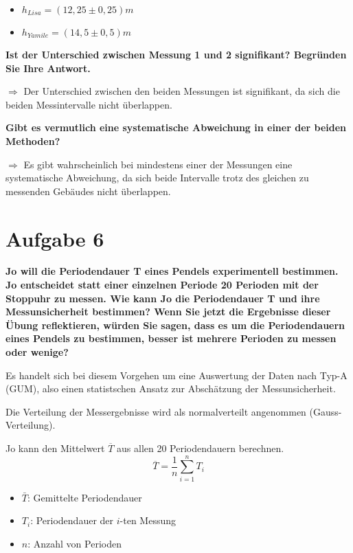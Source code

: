 \documentclass[
]{article}
\providecommand{\tightlist}{%
  \setlength{\itemsep}{0pt}\setlength{\parskip}{0pt}}
\begin{document}
\begin{itemize}
\tightlist
\item
  \(h_{Lisa}= (12,25 \pm 0,25)m\)
\item
  \(h_{Yamile}= (14,5 \pm 0,5)m\)
\end{itemize}

\textbf{Ist der Unterschied zwischen Messung 1 und 2 signifikant?
Begründen Sie Ihre Antwort.}

\(\Rightarrow\) Der Unterschied zwischen den beiden Messungen ist
signifikant, da sich die beiden Messintervalle nicht überlappen.

\textbf{Gibt es vermutlich eine systematische Abweichung in einer der
beiden Methoden?}

\(\Rightarrow\) Es gibt wahrscheinlich bei mindestens einer der
Messungen eine systematische Abweichung, da sich beide Intervalle trotz
des gleichen zu messenden Gebäudes nicht überlappen.

\hypertarget{aufgabe-6}{%
\section{Aufgabe 6}\label{aufgabe-6}}

\textbf{Jo will die Periodendauer T eines Pendels experimentell
bestimmen. Jo entscheidet statt einer einzelnen Periode 20 Perioden mit
der Stoppuhr zu messen. Wie kann Jo die Periodendauer T und ihre
Messunsicherheit bestimmen? Wenn Sie jetzt die Ergebnisse dieser Übung
reflektieren, würden Sie sagen, dass es um die Periodendauern eines
Pendels zu bestimmen, besser ist mehrere Perioden zu messen oder
wenige?}

Es handelt sich bei diesem Vorgehen um eine Auswertung der Daten nach
Typ-A (GUM), also einen statistschen Ansatz zur Abschätzung der
Messunsicherheit.

Die Verteilung der Messergebnisse wird als normalverteilt angenommen
(Gauss-Verteilung).

Jo kann den Mittelwert \(\overline{T}\) aus allen 20 Periodendauern
berechnen. \[\overline{T} = \frac{1}{n}\sum \limits_{i=1}^nT_i\]

\begin{itemize}
\tightlist
\item
  \(\bar{T}\): Gemittelte Periodendauer
\item
  \(T_i\): Periodendauer der \(i\)-ten Messung
\item
  \(n\): Anzahl von Perioden
\end{itemize}
\end{document}
